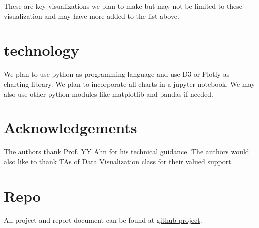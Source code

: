 \documentclass[sigconf]{acmart}
\begin{document}
These are key visualizations we plan to make but may not be limited to these 
visualization and may have more added to the list above. 

\section{technology}
We plan to use python as programming language and use D3 or Plotly as charting
library. We plan to incorporate all charts in a jupyter notebook. We may also
use other python modules like matplotlib and pandas if needed. 




%

%



\section{Acknowledgements}
 The authors thank Prof. YY Ahn for his technical guidance. The
 authors would also like to thank TAs of Data Visualization class for their valued
 support. 

\section{Repo} 
 All project and report document can be found at \href{https://github.com/abhishek8gupta/dviz-project-summer2018}{github project}.

\nocite{*}


\end{document}
